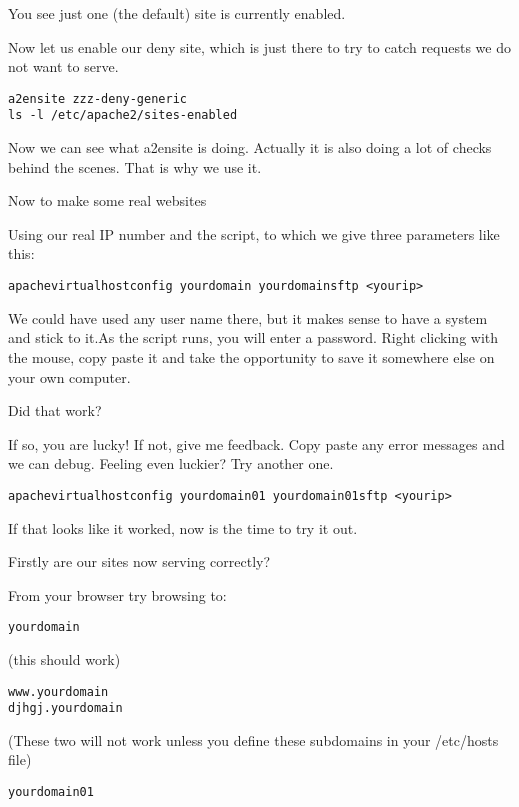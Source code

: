 \documentclass[12pt, a4paper]{article}
\begin{document}
You see just one (the default) site is currently enabled.

Now let us enable our deny site, which is just there to try to catch requests we do not want to serve.
\begin{verbatim}
a2ensite zzz-deny-generic 
ls -l /etc/apache2/sites-enabled 
\end{verbatim}



Now we can see what a2ensite is doing. Actually it is also doing a lot of checks behind the scenes. That is why we use it.

Now to make some real websites

Using our real IP number and the script, to which we give three parameters like this:

\begin{verbatim}
apachevirtualhostconfig yourdomain yourdomainsftp <yourip>
\end{verbatim}


We could have used any user name there, but it makes sense to have a system and stick to it.As the script runs, you will enter a password. Right clicking with the mouse, copy paste it and take the opportunity to save it somewhere else on your own computer.

Did that work?

If so, you are lucky! If not, give me feedback. Copy paste any error messages and we can debug.
Feeling even luckier? Try another one.

\begin{verbatim}
apachevirtualhostconfig yourdomain01 yourdomain01sftp <yourip>
\end{verbatim}


If that looks like it worked, now is the time to try it out.

Firstly are our sites now serving correctly?

From your browser try browsing to:

\begin{verbatim}
yourdomain
\end{verbatim}


(this should work)

\begin{verbatim}
www.yourdomain
djhgj.yourdomain 
\end{verbatim}


(These two will not work unless you define these subdomains in your /etc/hosts file)

\begin{verbatim}
yourdomain01 
\end{verbatim}
\end{document}
